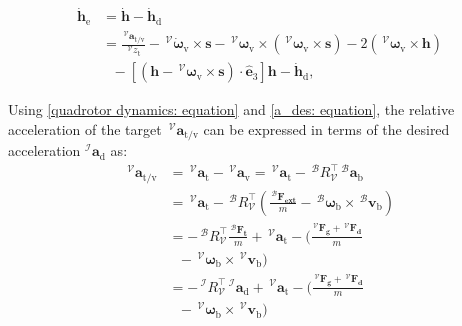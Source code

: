 \documentclass[lettersize,journal]{IEEEtran}
\begin{document}
\begin{align} \label{h_e_dot: equation}
    \dot{\boldsymbol{h}}_\text{e} &= \dot{\boldsymbol{h}} - \dot{\boldsymbol{h}}_\text{d} \nonumber \\
    &= \frac{\,^\mathcal{V} \boldsymbol{a}_{\text{t/v}}}{\,^\mathcal{V} z_{\text{t}}} - \,^\mathcal{V} \dot{\boldsymbol{\omega}}_{\text{v}} \times \boldsymbol{s} - \,^\mathcal{V} \boldsymbol{\omega}_{\text{v}} \times \left( \,^\mathcal{V} \boldsymbol{\omega}_{\text{v}} \times \boldsymbol{s} \right) - 2 \left( \,^\mathcal{V} \boldsymbol{\omega}_{\text{v}} \times \boldsymbol{h} \right) \nonumber \\
    &~~~ - \left[\left( \boldsymbol{h} - \,^\mathcal{V} \boldsymbol{\omega}_{\text{v}} \times \boldsymbol{s} \right) \cdot \hat{\boldsymbol{e}}_3 \right] \boldsymbol{h} - \dot{\boldsymbol{h}}_\text{d},
\end{align}

Using \eqref{quadrotor dynamics: equation} and \eqref{a_des: equation}, the relative acceleration of the target $\,^\mathcal{V}\boldsymbol{a}_{\text{t/v}}$ can be expressed in terms of the desired acceleration $^\mathcal{I}\boldsymbol{a}_{\text{d}}$ as:
\begin{align}
    \label{a_tb: equation}
    \,^\mathcal{V}\boldsymbol{a}_{\text{t/v}} &= \,^\mathcal{V}\boldsymbol{a}_{\text{t}} -\,^\mathcal{V}\boldsymbol{a}_{\text{v}} = \,^\mathcal{V}\boldsymbol{a}_{\text{t}} - \,^\mathcal{B}R_\mathcal{V}^\top \,^\mathcal{B}\boldsymbol{a}_{\text{b}} \nonumber \\
    &= \,^\mathcal{V}\boldsymbol{a}_{\text{t}} - \,^\mathcal{B}R_\mathcal{V}^\top \left(\frac{\,^\mathcal{B} \boldsymbol{F_{\text{ext}}}}{m} - \,^\mathcal{B} \boldsymbol{\omega}_{\text{b}} \times \,^\mathcal{B} \boldsymbol{v}_{\text{b}} \right) \nonumber \\
    &= - \,^\mathcal{B}R_\mathcal{V}^\top \frac{\,^\mathcal{B} \boldsymbol{F_{\text{t}}}}{m} + \,^\mathcal{V}\boldsymbol{a}_{\text{t}} - \bigg(\frac{\,^\mathcal{V} \boldsymbol{F_{\text{g}}} + \,^\mathcal{V} \boldsymbol{F_{\text{d}}}}{m} \nonumber \\
    &~~~ - \,^\mathcal{V} \boldsymbol{\omega}_{\text{b}} \times \,^\mathcal{V} \boldsymbol{v}_{\text{b}} \bigg) \nonumber \\
    &= - \,^\mathcal{I}R_\mathcal{V}^\top \, ^\mathcal{I}\boldsymbol{a}_{\text{d}} + \,^\mathcal{V}\boldsymbol{a}_{\text{t}} - \bigg(\frac{\,^\mathcal{V} \boldsymbol{F_{\text{g}}} + \,^\mathcal{V} \boldsymbol{F_{\text{d}}}}{m} \nonumber \\
    &~~~ - \,^\mathcal{V} \boldsymbol{\omega}_{\text{b}} \times \,^\mathcal{V} \boldsymbol{v}_{\text{b}} \bigg)
\end{align}
\end{document}
